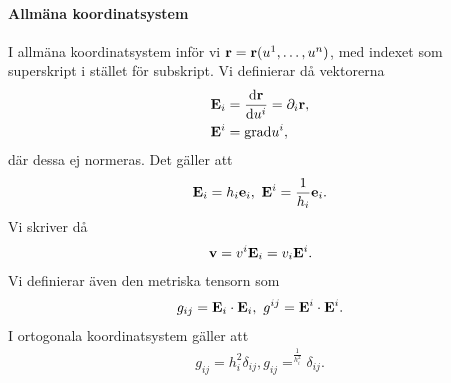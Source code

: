 \paragraph{Allmäna koordinatsystem}
I allmäna koordinatsystem inför vi $\vb{r} = \vb{r}(u^1, \dots, u^n)$, med indexet som superskript i stället för subskript. Vi definierar då vektorerna
\begin{align*}
	\vb{E}_{i} &= \dv{\vb{r}}{u^i} = \partial_{i}\vb{r}, \\
	\vb{E}^{i} &= \text{grad}u^i,
\end{align*}
där dessa ej normeras. Det gäller att
\begin{align*}
	\vb{E}_{i} = h_i\vb{e}_{i},\ \vb{E}^{i} = \frac{1}{h_i}\vb{e}_{i}.
\end{align*}
Vi skriver då
\begin{align*}
	\vb{v} = v^i\vb{E}_i = v_i\vb{E}^i.
\end{align*}
Vi definierar även den metriska tensorn som
\begin{align*}
	g_{ij} = \vb{E}_i\cdot\vb{E}_i,\ g^{ij} = \vb{E}^i\cdot\vb{E}^i.
\end{align*}
I ortogonala koordinatsystem gäller att
\begin{align*}
	g_{ij} = h_i^2\delta_{ij}, g_{ij} = ^\frac{1}{h_i^2}\delta_{ij}.
\end{align*}